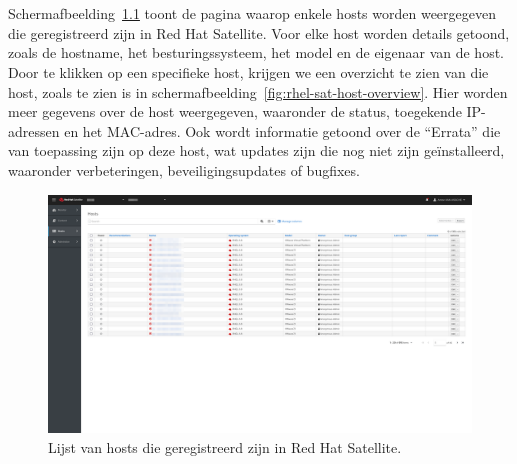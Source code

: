 
\chapter{}%
\label{ch:bijlage_red_hat_satellite}

Schermafbeelding~\ref{fig:rhel-sat-hosts} toont de pagina waarop enkele hosts worden weergegeven die geregistreerd zijn in Red Hat Satellite.
Voor elke host worden details getoond, zoals de hostname, het besturingssysteem, het model en de eigenaar van de host.
Door te klikken op een specifieke host, krijgen we een overzicht te zien van die host, zoals te zien is in schermafbeelding~\ref{fig:rhel-sat-host-overview}.
Hier worden meer gegevens over de host weergegeven, waaronder de status, toegekende IP-adressen en het MAC-adres.
Ook wordt informatie getoond over de ``Errata'' die van toepassing zijn op deze host, wat updates zijn die nog niet zijn ge\"installeerd, waaronder verbeteringen, beveiligingsupdates of bugfixes.

\begin{figure}[h!]
    \includegraphics[width=\textwidth]
    {./graphics/state-of-the-art/rhel-satellite/rhel-sat-hosts.png}
    \caption[Hosts geregistreerd in Red Hat Satellite.]{\label{fig:rhel-sat-hosts}Lijst van hosts die geregistreerd zijn in Red Hat Satellite.}
\end{figure}

